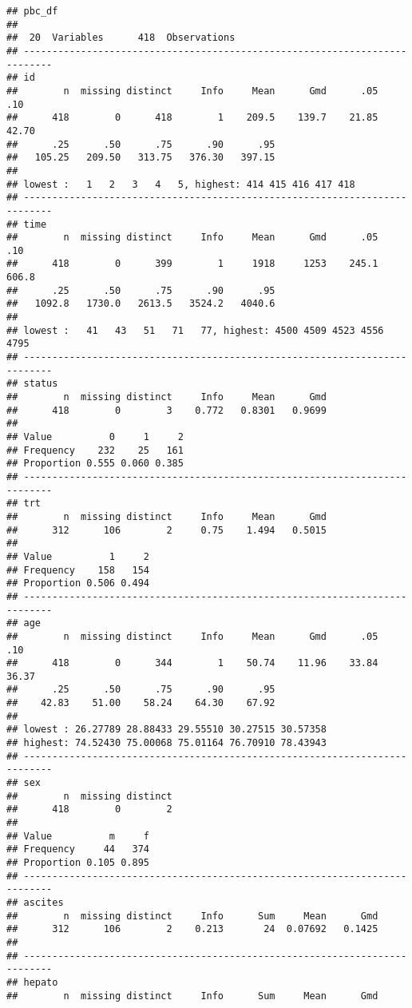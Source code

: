 \documentclass[]{book}
\theoremstyle{definition}
\theoremstyle{definition}
\theoremstyle{definition}
\theoremstyle{remark}
\begin{document}
\begin{verbatim}
## pbc_df 
## 
##  20  Variables      418  Observations
## ---------------------------------------------------------------------------
## id 
##        n  missing distinct     Info     Mean      Gmd      .05      .10 
##      418        0      418        1    209.5    139.7    21.85    42.70 
##      .25      .50      .75      .90      .95 
##   105.25   209.50   313.75   376.30   397.15 
## 
## lowest :   1   2   3   4   5, highest: 414 415 416 417 418
## ---------------------------------------------------------------------------
## time 
##        n  missing distinct     Info     Mean      Gmd      .05      .10 
##      418        0      399        1     1918     1253    245.1    606.8 
##      .25      .50      .75      .90      .95 
##   1092.8   1730.0   2613.5   3524.2   4040.6 
## 
## lowest :   41   43   51   71   77, highest: 4500 4509 4523 4556 4795
## ---------------------------------------------------------------------------
## status 
##        n  missing distinct     Info     Mean      Gmd 
##      418        0        3    0.772   0.8301   0.9699 
##                             
## Value          0     1     2
## Frequency    232    25   161
## Proportion 0.555 0.060 0.385
## ---------------------------------------------------------------------------
## trt 
##        n  missing distinct     Info     Mean      Gmd 
##      312      106        2     0.75    1.494   0.5015 
##                       
## Value          1     2
## Frequency    158   154
## Proportion 0.506 0.494
## ---------------------------------------------------------------------------
## age 
##        n  missing distinct     Info     Mean      Gmd      .05      .10 
##      418        0      344        1    50.74    11.96    33.84    36.37 
##      .25      .50      .75      .90      .95 
##    42.83    51.00    58.24    64.30    67.92 
## 
## lowest : 26.27789 28.88433 29.55510 30.27515 30.57358
## highest: 74.52430 75.00068 75.01164 76.70910 78.43943
## ---------------------------------------------------------------------------
## sex 
##        n  missing distinct 
##      418        0        2 
##                       
## Value          m     f
## Frequency     44   374
## Proportion 0.105 0.895
## ---------------------------------------------------------------------------
## ascites 
##        n  missing distinct     Info      Sum     Mean      Gmd 
##      312      106        2    0.213       24  0.07692   0.1425 
## 
## ---------------------------------------------------------------------------
## hepato 
##        n  missing distinct     Info      Sum     Mean      Gmd 

\end{verbatim}
\end{document}

